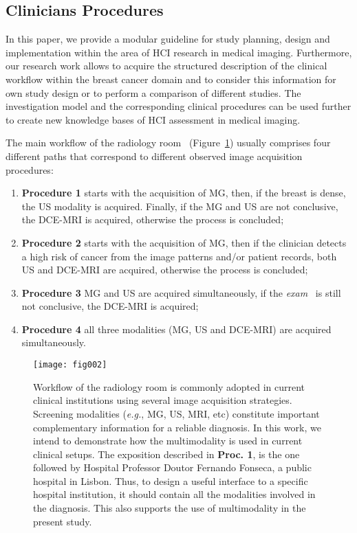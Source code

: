 \subsection{Clinicians Procedures}
\label{sec:workflow}

In this paper, we provide a modular guideline for study planning, design and implementation within the area of HCI research in medical imaging.
Furthermore, our research work allows to acquire the structured description of the clinical workflow within the breast cancer domain and to consider this information for own study design or to perform a comparison of different studies.
The investigation model and the corresponding clinical procedures can be used further to create new knowledge bases of HCI assessment in medical imaging.

\hfill

\noindent
The main workflow of the radiology room~\cite{wagner2015analysis} (Figure~\ref{fig:fig002}) usually comprises four different paths that correspond to different observed image acquisition procedures:

\begin{enumerate}
\item \textbf{Procedure 1} starts with the acquisition of MG, then, if the breast is dense, the US modality is acquired. Finally, if the MG and US are not conclusive, the DCE-MRI is acquired, otherwise the process is concluded;
\item \textbf{Procedure 2} starts with the acquisition of MG, then if the clinician detects a high risk of cancer from the image patterns and/or patient records, both US and DCE-MRI are acquired, otherwise the process is concluded;
\item \textbf{Procedure 3} MG and US are acquired simultaneously, if the {\it exam}~\cite{wagner2015analysis} is still not conclusive, the DCE-MRI is acquired;
\item \textbf{Procedure 4} all three modalities (MG, US and DCE-MRI) are acquired simultaneously.
\end{enumerate}

\begin{figure}
\centering
\texttt{[image: fig002]}
\caption{Workflow of the radiology room is commonly adopted in current clinical institutions using several image acquisition strategies. Screening modalities ({\it e.g.}, MG, US, MRI, etc) constitute important complementary information for a reliable diagnosis. In this work, we intend to demonstrate how the multimodality is used in current clinical setups. The exposition described in {\bf Proc. 1}, is the one followed by Hospital Professor Doutor Fernando Fonseca, a public hospital in Lisbon. Thus, to design a useful interface to a specific hospital institution, it should contain all the modalities involved in the diagnosis. This also supports the use of multimodality in the present study.}
\label{fig:fig002}
\end{figure}


